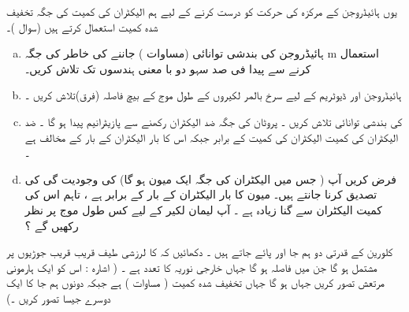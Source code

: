  یوں ہائیڈروجن کے مرکزہ کی حرکت کو درست کرنے کے لیے ہم الیکٹران  کی کمیت کی جگہ تخفیف شدہ کمیت استعمال کرتے ہیں  (سوال )۔ 
\begin{enumerate}[a.]
\item
 ہائیڈروجن کی بندشی  توانائی (مساوات ) جاننے کی خاطر   کی جگہ m استعمال کرنے سے پیدا فی صد  سہو   دو با معنی ہندسوں تک   تلاش کریں۔  
\item
 ہائیڈروجن اور ڈیوٹریم کے لیے   سرخ بالمر لکیروں      کے طول موج کے بیچ    فاصلہ  (فرق)تلاش کریں ۔ 
\item
  کی بندشی توانائی تلاش کریں ۔ پروٹان کی جگہ  ضد الیکٹران رکھنے سے پازیٹرانیم پیدا ہو گا ۔ ضد الیکٹران کی کمیت الیکٹران کی کمیت کے برابر   جبکہ اس کا بار  الیکٹران کے بار  کے مخالف ہے ۔ 
\item
 فرض کریں آپ   (    جس میں الیکٹران کی جگہ ایک میون  ہو گا) کی وجودیت گی کی تصدیق کرنا جانتے ہیں۔ میون کا بار  الیکٹران کے بار  کے برابر ہے ، تاہم  اس کی کمیت  الیکٹران سے گنا زیادہ   ہے ۔  آپ لیمان    لکیر    کے لیے کس طول  موج پر نظر رکھیں گے ؟
\end{enumerate}
کلورین کے قدرتی دو ہم جا    اور    پائے جاتے ہیں ۔ دکھائیں کہ   کا   لرزشی   طیف قریب قریب   جوڑیوں پر مشتمل ہو گا   جن میں فاصلہ    ہو گا جہاں  خارجی نوریہ کا تعدد ہے ۔  ( اشارہ : اس کو ایک ہارمونی مرتعش تصور کریں جہاں   ہو گا   جہاں   تخفیف شدہ کمیت ( مساوات   ) ہے   جبکہ  دونوں ہم جا  کا    ایک دوسرے  جیسا تصور کریں ۔) 


